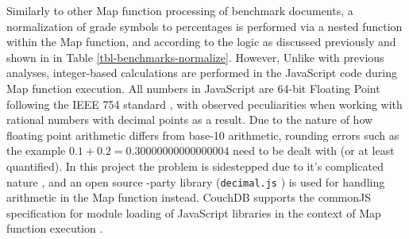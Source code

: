 Similarly to other Map function processing of benchmark documents, a normalization of grade symbols to percentages is performed via a nested function within the Map function, and according to the logic as discussed previously and shown in in Table \ref{tbl-benchmarks-normalize}. However, Unlike with previous analyses, integer-based calculations are performed in the JavaScript code during Map function execution. All numbers in JavaScript are 64-bit Floating Point following the IEEE 754 standard \cite{floatingPoint}, with observed peculiarities when working with rational numbers with decimal points as a result. Due to the nature of how floating point arithmetic differs from base-10 arithmetic, rounding errors such as the example $0.1 + 0.2 = 0.30000000000000004$ need to be dealt with (or at least quantified). In this project the problem is sidestepped due to it's complicated nature \cite{Goldberg1991}, and an open source -party library (\texttt{decimal.js} \cite{decimaljs}) is used for handling arithmetic in the Map function instead. CouchDB supports the commonJS specification for module loading of JavaScript libraries in the context of Map function execution \cite{commonJsMapFn}.


